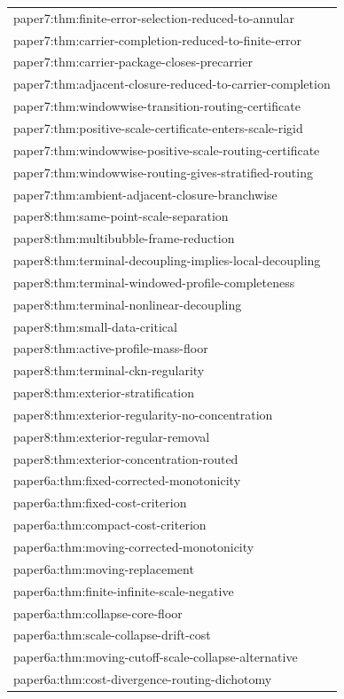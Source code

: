\documentclass[11pt]{amsart}
\begin{document}
\begin{longtable}{@{}>{\ttfamily\footnotesize\raggedright\arraybackslash}p{}@{}}
paper7:thm:finite-error-selection-reduced-to-annular\\
paper7:thm:carrier-completion-reduced-to-finite-error\\
paper7:thm:carrier-package-closes-precarrier\\
paper7:thm:adjacent-closure-reduced-to-carrier-completion\\
paper7:thm:windowwise-transition-routing-certificate\\
paper7:thm:positive-scale-certificate-enters-scale-rigid\\
paper7:thm:windowwise-positive-scale-routing-certificate\\
paper7:thm:windowwise-routing-gives-stratified-routing\\
paper7:thm:ambient-adjacent-closure-branchwise\\
paper8:thm:same-point-scale-separation\\
paper8:thm:multibubble-frame-reduction\\
paper8:thm:terminal-decoupling-implies-local-decoupling\\
paper8:thm:terminal-windowed-profile-completeness\\
paper8:thm:terminal-nonlinear-decoupling\\
paper8:thm:small-data-critical\\
paper8:thm:active-profile-mass-floor\\
paper8:thm:terminal-ckn-regularity\\
paper8:thm:exterior-stratification\\
paper8:thm:exterior-regularity-no-concentration\\
paper8:thm:exterior-regular-removal\\
paper8:thm:exterior-concentration-routed\\
paper6a:thm:fixed-corrected-monotonicity\\
paper6a:thm:fixed-cost-criterion\\
paper6a:thm:compact-cost-criterion\\
paper6a:thm:moving-corrected-monotonicity\\
paper6a:thm:moving-replacement\\
paper6a:thm:finite-infinite-scale-negative\\
paper6a:thm:collapse-core-floor\\
paper6a:thm:scale-collapse-drift-cost\\
paper6a:thm:moving-cutoff-scale-collapse-alternative\\
paper6a:thm:cost-divergence-routing-dichotomy\\

\end{longtable}
\end{document}
